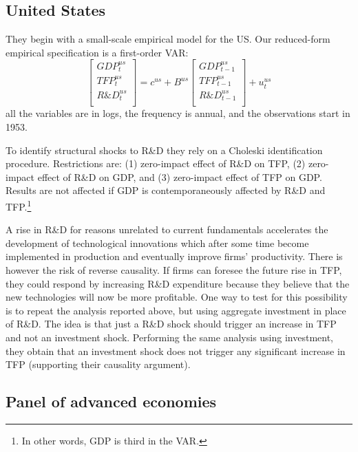 \documentclass{article}
\begin{document}
\subsection*{United States}

They begin with a small-scale empirical model for the US. Our reduced-form empirical specification is a first-order VAR:
\begin{equation}
\begin{bmatrix}
GDP_t^{us} \\
TFP_t^{us} \\
R\&D_t^{us} \\
\end{bmatrix} = c^{us} + B^{us} \begin{bmatrix}
GDP_{t-1}^{us} \\
TFP_{t-1}^{us} \\
R\&D_{t-1}^{us} \\ 
\end{bmatrix} + u_t^{us}
\end{equation}
all the variables are in logs, the frequency is annual, and the observations start in 1953.

To identify structural shocks to R\&D they rely on a Choleski identification procedure. Restrictions are: (1) zero-impact effect of R\&D on TFP, (2) zero-impact effect of R\&D on GDP, and (3) zero-impact effect of TFP on GDP. Results are not affected if GDP is contemporaneously affected by R\&D and TFP.\footnote{In other words, GDP is third in the VAR.}

A rise in R\&D for reasons unrelated to current fundamentals accelerates the development of technological innovations which after some time become implemented in production and eventually improve firms' productivity. There is however the risk of reverse causality. If firms can foresee the future rise in TFP, they could respond by increasing R\&D expenditure because they believe that the new technologies will now be more profitable. One way to test for this possibility is to repeat the analysis reported above, but using aggregate investment in place of R\&D. The idea is that just a R\&D shock should trigger an increase in TFP and not an investment shock. Performing the same analysis using investment, they obtain that an investment shock does not trigger any significant increase in TFP (supporting their causality argument).

\subsection*{Panel of advanced economies}
\end{document}
